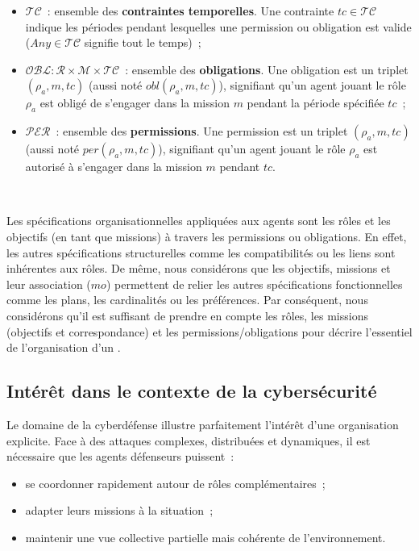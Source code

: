 \begin{itemize}
  \item $\mathcal{TC}$~: ensemble des \textbf{contraintes temporelles}. Une contrainte $tc \in \mathcal{TC}$ indique les périodes pendant lesquelles une permission ou obligation est valide ($Any \in \mathcal{TC}$ signifie tout le temps)~;
  \item $\mathcal{OBL}: \mathcal{R} \times \mathcal{M} \times \mathcal{TC}$~: ensemble des \textbf{obligations}. Une obligation est un triplet $(\rho_a, m, tc)$ (aussi noté $obl(\rho_a, m, tc)$), signifiant qu'un agent jouant le rôle $\rho_a$ est obligé de s'engager dans la mission $m$ pendant la période spécifiée $tc$~;
  \item $\mathcal{PER}$~: ensemble des \textbf{permissions}. Une permission est un triplet $(\rho_a, m, tc)$ (aussi noté $per(\rho_a, m, tc)$), signifiant qu'un agent jouant le rôle $\rho_a$ est autorisé à s'engager dans la mission $m$ pendant $tc$.
\end{itemize}

\

\noindent Les spécifications organisationnelles appliquées aux agents sont les rôles et les objectifs (en tant que missions) à travers les permissions ou obligations. En effet, les autres spécifications structurelles comme les compatibilités ou les liens sont inhérentes aux rôles. De même, nous considérons que les objectifs, missions et leur association ($mo$) permettent de relier les autres spécifications fonctionnelles comme les plans, les cardinalités ou les préférences.
Par conséquent, nous considérons qu'il est suffisant de prendre en compte les rôles, les missions (objectifs et correspondance) et les permissions/obligations pour décrire l'essentiel de l'organisation d'un .

\subsection{Intérêt dans le contexte de la cybersécurité}

Le domaine de la cyberdéfense illustre parfaitement l'intérêt d'une organisation explicite. Face à des attaques complexes, distribuées et dynamiques, il est nécessaire que les agents défenseurs puissent~:
\begin{itemize}
  \item se coordonner rapidement autour de rôles complémentaires~;
  \item adapter leurs missions à la situation~;
  \item maintenir une vue collective partielle mais cohérente de l'environnement.
\end{itemize}

